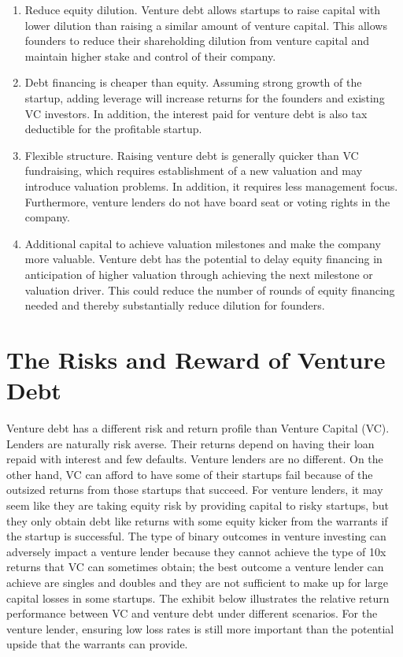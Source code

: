 \documentclass[11pt]{article}
\begin{document}
\begin{enumerate}
  \item Reduce equity dilution. Venture debt allows startups to raise capital with lower dilution than raising a similar amount of venture capital. This allows founders to reduce their shareholding dilution from venture capital and maintain higher stake and control of their company.

  \item Debt financing is cheaper than equity. Assuming strong growth of the startup, adding leverage will increase returns for the founders and existing VC investors. In addition, the interest paid for venture debt is also tax deductible for the profitable startup.

  \item Flexible structure. Raising venture debt is generally quicker than VC fundraising, which requires establishment of a new valuation and may introduce valuation problems. In addition, it requires less management focus. Furthermore, venture lenders do not have board seat or voting rights in the company.

  \item Additional capital to achieve valuation milestones and make the company more valuable. Venture debt has the potential to delay equity financing in anticipation of higher valuation through achieving the next milestone or valuation driver. This could reduce the number of rounds of equity financing needed and thereby substantially reduce dilution for founders.

\end{enumerate}

\section*{The Risks and Reward of Venture Debt}
Venture debt has a different risk and return profile than Venture Capital (VC). Lenders are naturally risk averse. Their returns depend on having their loan repaid with interest and few defaults. Venture lenders are no different. On the other hand, VC can afford to have some of their startups fail because of the outsized returns from those startups that succeed. For venture lenders, it may seem like they are taking equity risk by providing capital to risky startups, but they only obtain debt like returns with some equity kicker from the warrants if the startup is successful. The type of binary outcomes in venture investing can adversely impact a venture lender because they cannot achieve the type of 10x returns that VC can sometimes obtain; the best outcome a venture lender can achieve are singles and doubles and they are not sufficient to make up for large capital losses in some startups. The exhibit below illustrates the relative return performance between VC and venture debt under different scenarios. For the venture lender, ensuring low loss rates is still more important than the potential upside that the warrants can provide.
\end{document}

